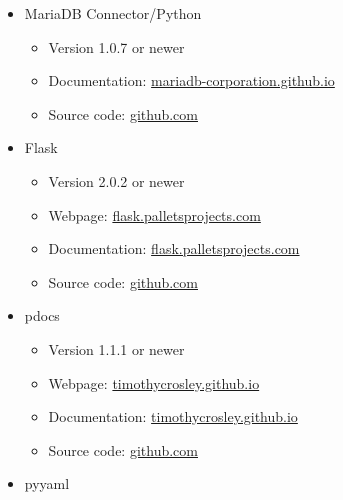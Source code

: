 \documentclass{scrreprt}
\begin{document}
\begin{itemize}
\begin{itemize}
\begin{itemize}
        \end{itemize}

        \item \gls{MariaDB} Connector/\gls{Python}
        \begin{itemize}

            \item Version 1.0.7 or newer
            \item \gls{Documentation}: \href{https://mariadb-corporation.github.io/mariadb-connector-python/}{mariadb-corporation.github.io}
            \item Source code: \href{https://github.com/mariadb-corporation/mariadb-connector-python}{github.com}

        \end{itemize}

        \item \gls{Flask}
        \begin{itemize}

            \item Version 2.0.2 or newer
            \item Webpage: \href{https://flask.palletsprojects.com/en/2.0.x/}{flask.palletsprojects.com}
            \item \gls{Documentation}: \href{https://flask.palletsprojects.com/en/2.0.x/api/}{flask.palletsprojects.com}
            \item Source code: \href{https://github.com/pallets/flask}{github.com}

        \end{itemize}
        
        \item pdocs
        \begin{itemize}

            \item Version 1.1.1 or newer
            \item Webpage: \href{https://timothycrosley.github.io/pdocs/}{timothycrosley.github.io}
            \item \gls{Documentation}: \href{https://timothycrosley.github.io/pdocs/reference/pdocs/api/}{timothycrosley.github.io}
            \item Source code: \href{https://github.com/timothycrosley/pdocs}{github.com} 

        \end{itemize}
        
        \item pyyaml
        \begin{itemize}
        

\end{itemize}
\end{itemize}
\end{itemize}
\end{document}
